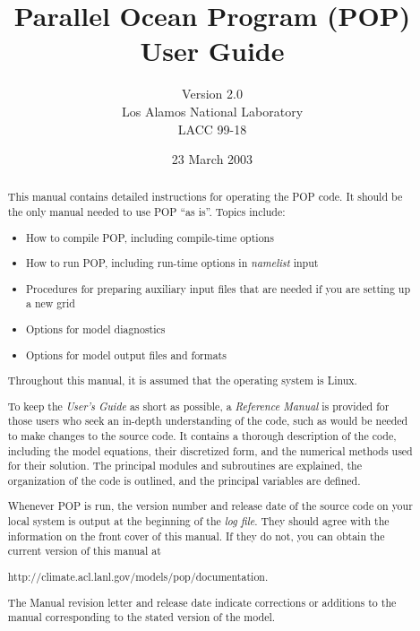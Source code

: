 \documentclass[12,twoside,openright]{report}
\title{Parallel Ocean Program (POP) User Guide}
\author{Version 2.0 \\
        Los Alamos National Laboratory \\
        LACC 99-18}
\date{23 March 2003}
\begin{document}
\maketitle

\begin{abstract}

This manual contains detailed instructions for operating the
POP code. It should be the only manual needed to use POP ``as is''.
Topics include:

\begin{itemize}
\item How to compile POP, including compile-time options

\item How to run POP, including run-time options in {\em namelist}
      input

\item Procedures for preparing auxiliary input files that are
      needed if you are setting up a new grid

\item Options for model diagnostics

\item Options for model output files and formats
\end{itemize}

Throughout this manual, it is assumed that the operating
system is Linux.

To keep the {\em User's Guide} as short as possible, a
{\em Reference Manual} is provided for those users who
seek an in-depth understanding of the code, such as
would be needed to make changes to the source code. It
contains a thorough description of the code, including
the model equations, their discretized form, and the
numerical methods used for their solution.  The principal
modules and subroutines are explained, the organization
of the code is outlined, and the principal variables are
defined.

Whenever POP is run, the version number and release date of
the source code on your local system is output at the beginning
of the {\em log file}.  They
should agree with the information on the front cover of this
manual.  If they do not, you can obtain the current version
of this manual at

\noindent
{}
                  {http://climate.acl.lanl.gov/models/pop/documentation}.

The Manual revision letter and release date indicate corrections
or additions to the manual corresponding to the stated version
of the model.


\end{abstract}
\end{document}
